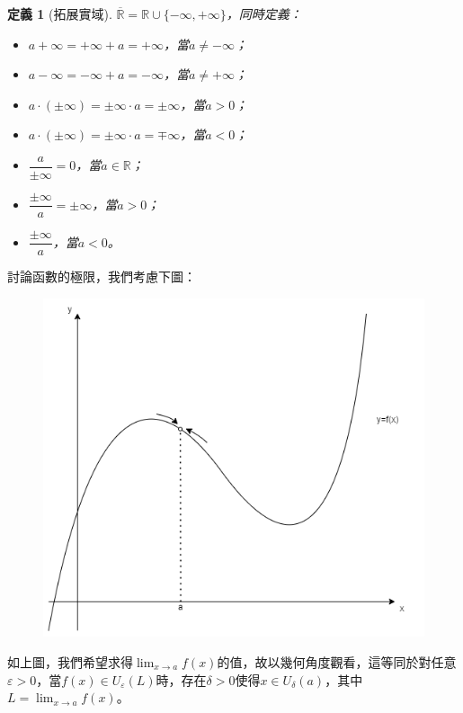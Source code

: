 \documentclass[12pt]{article}
\newtheorem{definition}{定義}
\begin{document}
    \begin{definition}[拓展實域]
        $\overline{\mathbb{R}}=\mathbb{R}\cup\{-\infty,+\infty\}$，同時定義：\begin{itemize}
            \item $a+\infty=+\infty+a=+\infty$，當$a\neq -\infty$；
            \item $a-\infty=-\infty+a=-\infty$，當$a\neq +\infty$；
            \item $a\cdot(\pm\infty)=\pm\infty\cdot a=\pm\infty$，當$a>0$；
            \item $a\cdot(\pm\infty)=\pm\infty\cdot a=\mp\infty$，當$a<0$；
            \item $\dfrac{a}{\pm\infty}=0$，當$a\in\mathbb{R}$；
            \item $\dfrac{\pm\infty}{a}=\pm\infty$，當$a>0$；
            \item $\dfrac{\pm\infty}{a}$，當$a<0$。
        \end{itemize}
    \end{definition}
    
    討論函數的極限，我們考慮下圖：

    \begin{figure}[H]
        \centering
        \includegraphics[scale=0.5]{function_limit.png}
    \end{figure}

    如上圖，我們希望求得$\lim_{x\to a}f(x)$的值，故以幾何角度觀看，這等同於對任意$\varepsilon>0$，當$f(x)\in U_\varepsilon(L)$時，存在$\delta>0$使得$x\in U_\delta(a)$，其中$L=\lim_{x\to a}f(x)$。
\end{document}
